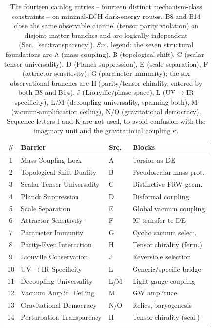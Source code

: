 \documentclass[aps,prd,twocolumn,superscriptaddress,preprintnumbers,nofootinbib,longbibliography,floatfix]{revtex4-2}
\begin{document}
\begin{table}[tb]
\caption{\label{tab:barriers} The fourteen catalog entries -- fourteen
distinct mechanism-class constraints -- on minimal-ECH dark-energy
routes. B8 and B14 close the same observable channel (tensor parity
violation) on disjoint matter branches and are logically independent
(Sec.~\ref{sec:transparency}). \emph{Src.} legend: the seven structural
foundations are A (mass-coupling), B (topological shift), C
(scalar-tensor universality), D (Planck suppression), E (scale
separation), F (attractor sensitivity), G (parameter immunity); the six
observational branches are H (parity/tensor-chirality, entered by both
B8 and B14), J (Liouville/phase-space), L (UV$\to$IR specificity), L/M
(decoupling universality, spanning both), M (vacuum-amplification
ceiling), N/O (gravitational democracy). Sequence letters I and K are
not used, to avoid confusion with the imaginary unit and the
gravitational coupling $\kappa$.}
\centering
\footnotesize
\begin{ruledtabular}
\begin{tabular}{clll}
\# & Barrier & Src.\ & Blocks \\
\midrule
1 & Mass-Coupling Lock & A & Torsion as DE \\
2 & Topological-Shift Duality & B & Pseudoscalar mass prot. \\
3 & Scalar-Tensor Universality & C & Distinctive FRW geom. \\
4 & Planck Suppression & D & Disformal coupling \\
5 & Scale Separation & E & Global vacuum coupling \\
6 & Attractor Sensitivity & F & IC transfer to DE \\
7 & Parameter Immunity & G & Cyclic vacuum select. \\
8 & Parity-Even Interaction & H & Tensor chirality (ferm.) \\
9 & Liouville Conservation & J & Reversible selection \\
10 & UV$\to$IR Specificity & L & Generic/specific bridge \\
11 & Decoupling Universality & L/M & Light gauge coupling \\
12 & Vacuum Amplif.\ Ceiling & M & GW amplitude \\
13 & Gravitational Democracy & N/O & Relics, baryogenesis \\
14 & Perturbation Transparency & H & Tensor chirality (scal.) \\
\end{tabular}
\end{ruledtabular}
\normalsize
\end{table}
\end{document}
